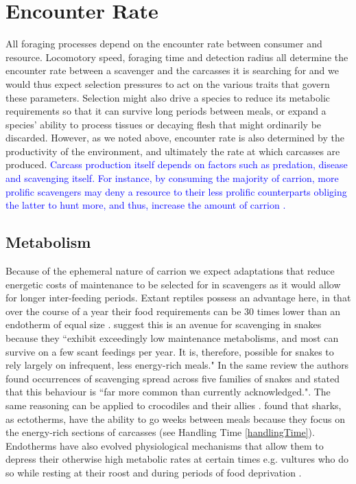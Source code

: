 \documentclass[a4paper,12pt]{article}
\begin{document}
\section{Encounter Rate}
All foraging processes depend on the encounter rate between consumer and resource. 
Locomotory speed, foraging time and detection radius all determine the encounter rate between a scavenger and the carcasses it is searching for and we would thus expect selection pressures to act on the various traits that govern these parameters.
Selection might also drive a species to reduce its metabolic requirements so that it can survive long periods between meals, or expand a species' ability to process tissues or decaying flesh that might ordinarily be discarded.
However, as we noted above, encounter rate is also determined by the productivity of the environment, and ultimately the rate at which carcasses are produced. 
\textcolor{blue}{Carcass production itself depends on factors such as predation, disease and scavenging itself. For instance, by consuming the majority of carrion, more prolific scavengers may deny a resource to their less prolific counterparts obliging the latter to hunt more, and thus, increase the amount of carrion \citep{moleon2014inter}.}

\subsection{Metabolism}
Because of the ephemeral nature of carrion \citep{devault2003scavenging,ruxton2004obligate} we expect adaptations that reduce energetic costs of maintenance to be selected for in scavengers as it would allow for longer inter-feeding periods. 
Extant reptiles possess an advantage here, in that over the course of a year their food requirements can be 30 times lower than an endotherm of equal size \citep{Nagy1621}.
\cite{devault2002scavenging} suggest this is an avenue for scavenging in snakes because they ``exhibit exceedingly low maintenance metabolisms, and most can survive on a few scant feedings per year.
It is, therefore, possible for snakes to rely largely on infrequent, less energy-rich meals."
In the same review the authors found occurrences of scavenging spread across five families of snakes and stated that this behaviour is ``far more common than currently acknowledged."\citep{devault2002scavenging}.
The same reasoning can be applied to crocodiles and their allies \citep{forrest2003evidence,moleon2015carcass}. 
\cite{carey1982temperature} found that sharks, as ectotherms, have the ability to go weeks between meals because they focus on the energy-rich sections of carcasses (see Handling Time \ref{handlingTime}). 
Endotherms have also evolved physiological mechanisms that allow them to depress their otherwise high metabolic rates at certain times e.g. vultures who do so while resting at their roost and during periods of food deprivation \citep{bahat1998nocturnal}.
\end{document}
